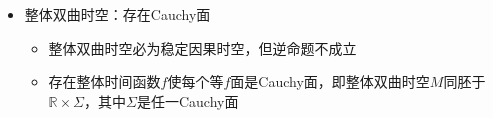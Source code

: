 \begin{itemize}
    设$S$是非编时闭子集，未来Cauchy视界
    \begin{gather*}
        H^+(S)=\overline{D^+(S)}-I^-(D^+(S))
    \end{gather*}
    \begin{itemize}
        \item $H^+(S)$是非编时闭集
        \item $H^+(S)=(I^+(S) \cup S) \cap \dot{I}^-(D^+(S))$
        \item $\forall p \in H^+(S)$，$\exists$过$p$的类光测地线$\lambda \subset H^+(S)$，或是未来不可延的，或是过去端点在$S$上
        \item $H(S)=\dot{D}(S)$
        \item 非空非编时闭集$\Sigma$是Cauchy面$\iff H(\Sigma)=\emptyset$
        \item 无边缘非编时闭集$\Sigma$是Cauchy面$\iff$任一双向不可延类光测地线必与$\Sigma, I^+(\Sigma), I^-(\Sigma)$分别相交
    \end{itemize}
    \item 整体双曲时空：存在Cauchy面
    \begin{itemize}
        \item 整体双曲时空必为稳定因果时空，但逆命题不成立
        \item 存在整体时间函数$f$使每个等$f$面是Cauchy面，即整体双曲时空$M$同胚于$\mathbb{R} \times \Sigma$，其中$\Sigma$是任一Cauchy面
    \end{itemize}
\end{itemize}